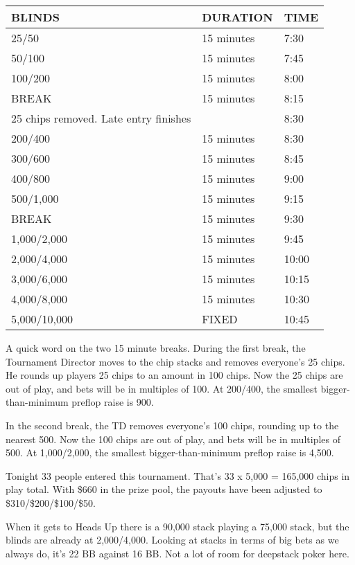 \begin{tabular}{|l|l|l|} \hline
BLINDS  &  DURATION   & TIME \\ \hline
25/50   &  15 minutes & 7:30 \\ \hline
50/100  &  15 minutes & 7:45 \\ \hline
100/200 &  15 minutes & 8:00 \\ \hline
BREAK   &  15 minutes & 8:15 \\ \hline
25 chips removed. Late entry finishes &  & 8:30\\ \hline
200/400 &  15 minutes & 8:30 \\ \hline
300/600 &  15 minutes & 8:45 \\ \hline
400/800 &  15 minutes & 9:00 \\ \hline
500/1,000 & 15 minutes & 9:15 \\ \hline
BREAK   &  15 minutes  & 9:30 \\ \hline
1,000/2,000 & 15 minutes & 9:45 \\ \hline
2,000/4,000 & 15 minutes & 10:00 \\ \hline
3,000/6,000 & 15 minutes & 10:15 \\ \hline
4,000/8,000 & 15 minutes & 10:30 \\ \hline
5,000/10,000 & FIXED & 10:45 \\ \hline
\end{tabular}

A quick word on the two 15 minute breaks. During the first break,
the Tournament Director moves to the chip stacks and removes
everyone's 25 chips. He rounds up players 25 chips to an amount
in 100 chips. Now the 25 chips are out of play, and bets will be
in multiples of 100. At 200/400, the smallest bigger-than-minimum
preflop raise is 900.

In the second break, the TD removes everyone's 100 chips, rounding up
to the nearest 500. Now the 100 chips are out of play, and bets
will be in multiples of 500. At 1,000/2,000, the smallest
bigger-than-minimum preflop raise is 4,500.

Tonight 33 people entered this tournament. That's 33 x 5,000 = 165,000
chips in play total. With \$660 in the prize pool, the payouts have been
adjusted to \$310/\$200/\$100/\$50.

When it gets to Heads Up there is a 90,000 stack
playing a 75,000 stack, but the blinds are already at 2,000/4,000.
Looking at stacks in terms of big bets as we always do,
it's 22 BB against 16 BB. Not a lot of room for deepstack
poker here.

